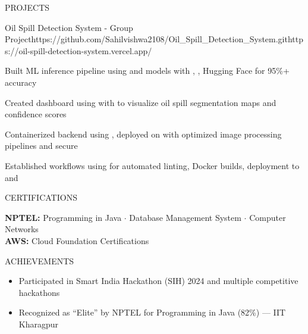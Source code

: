 \documentclass{resume}
\begin{document}
\begin{rSection}{PROJECTS}
\begin{rProject}{Oil Spill Detection System - Group Project}{https://github.com/Sahilvishwa2108/Oil_Spill_Detection_System.git}{https://oil-spill-detection-system.vercel.app/}
\item Built ML inference pipeline using  and  models with , , Hugging Face for 95\%+ accuracy
\item Created dashboard using  with  to visualize oil spill segmentation maps and confidence scores
\item Containerized backend using , deployed on  with optimized image processing pipelines and secure 
\item Established  workflows using  for automated linting, Docker builds, deployment to  and 
\end{rProject}

\end{rSection}

\begin{rSection}{CERTIFICATIONS}

\textbf{NPTEL:} Programming in Java $\cdot$ Database Management System $\cdot$ Computer Networks \\[1pt]
\textbf{AWS:} Cloud Foundation Certifications

\end{rSection}

\begin{rSection}{ACHIEVEMENTS}

\begin{itemize}[leftmargin=12pt, itemsep=0pt, label={\small$\bullet$}]
\item Participated in Smart India Hackathon (SIH) 2024 and multiple competitive hackathons
\item Recognized as ``Elite'' by NPTEL for Programming in Java (82\%) — IIT Kharagpur
\end{itemize}

\end{rSection}
\end{document}
